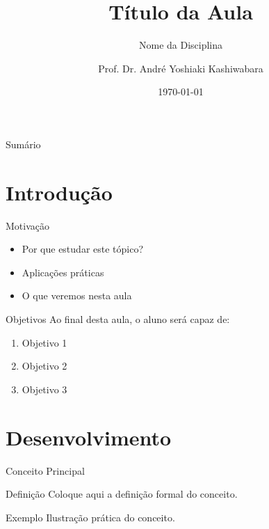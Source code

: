 \documentclass[aspectratio=169]{beamer}
\title{Título da Aula}
\subtitle{Nome da Disciplina}
\author[Prof. André <andreyoshiaki@dcomp.ufs.br>]{Prof. Dr. André Yoshiaki Kashiwabara}
\institute{Departamento de Computação\\Universidade Federal de Sergipe}
\date{\today}
\begin{document}
\begin{frame}
  \titlepage
\end{frame}

\begin{frame}{Sumário}
  \tableofcontents
\end{frame}

\section{Introdução}

\begin{frame}{Motivação}
  \begin{itemize}
    \item Por que estudar este tópico?
    \item Aplicações práticas
    \item O que veremos nesta aula
  \end{itemize}
\end{frame}

\begin{frame}{Objetivos}
  Ao final desta aula, o aluno será capaz de:
  \begin{enumerate}
    \item Objetivo 1
    \item Objetivo 2
    \item Objetivo 3
  \end{enumerate}
\end{frame}

\section{Desenvolvimento}

\begin{frame}{Conceito Principal}
  \begin{block}{Definição}
    Coloque aqui a definição formal do conceito.
  \end{block}

  \medskip
  \begin{exampleblock}{Exemplo}
    Ilustração prática do conceito.
  \end{exampleblock}
\end{frame}
\end{document}
